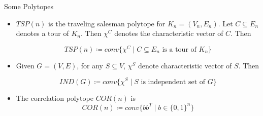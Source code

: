\documentclass[aspectratio=1610]{beamer}
\begin{document}
\begin{frame}{Some Polytopes}

	\begin{itemize}
		\item $TSP(n)$ is the traveling salesman polytope for $K_n=(V_n,E_n)$. Let $C\subseteq E_n$ denotes a tour of $K_n$. Then $\chi^C$ denotes the characteristic vector of $C$. Then \pause
		
		$$TSP(n)\coloneqq conv\{\chi^C\mid C\subseteq E_n\text{ is a tour of $K_n$}\}$$\pause

		\item Given $G=(V,E)$, for any $S\subseteq V$, $\chi^S$ denote characteristic vector of $S$. Then\pause
		
		$$IND(G)\coloneqq conv\{\chi^S\mid S\text{ is independent set of $G$}\}$$
		\item The correlation polytope $COR(n)$ is $$COR(n)\coloneqq conv\{bb^T\mid b\in\{0,1\}^n\}$$
	\end{itemize}


\end{frame}
    
\end{document}
